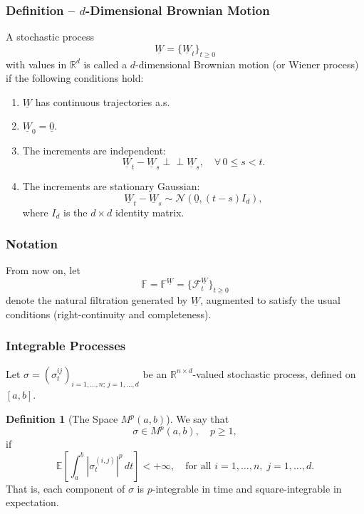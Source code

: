 \documentclass[12pt,a4paper]{article}
\theoremstyle{definition}
\newtheorem{definition}{Definition}[section]
\newcommand{\R}{\mathbb{R}}
\newcommand{\E}{\mathbb{E}}
\begin{document}
\subsubsection{Definition – $d$-Dimensional Brownian Motion}

A stochastic process
\[
\underline{W} = \{\underline{W}_t\}_{t \geq 0}
\]
with values in $\R^d$ is called a $d$-dimensional Brownian motion (or Wiener process) if the following conditions hold:

\begin{enumerate}
\item $\underline{W}$ has continuous trajectories a.s.
\item $\underline{W}_0 = \underline{0}$.
\item The increments are independent:
\[
\underline{W}_t - \underline{W}_s \perp\!\!\!\perp \underline{W}_s, \quad \forall \, 0 \leq s < t.
\]
\item The increments are stationary Gaussian:
\[
\underline{W}_t - \underline{W}_s \sim \mathcal{N}(\underline{0}, (t-s)I_d),
\]
where $I_d$ is the $d \times d$ identity matrix.
\end{enumerate}

\subsubsection{Notation}

From now on, let
\[
\mathbb{F} = \mathbb{F}^{\underline{W}} = \{\mathcal{F}_t^{\underline{W}}\}_{t \geq 0}
\]
denote the natural filtration generated by $\underline{W}$, augmented to satisfy the usual conditions (right-continuity and completeness).

\subsubsection{Integrable Processes}

Let $\sigma = (\sigma_t^{ij})_{i=1,\ldots,n; \, j=1,\ldots,d}$ be an $\R^{n \times d}$-valued stochastic process, defined on $[a,b]$.

\begin{definition}[The Space $M^p(a,b)$]
We say that
\[
\sigma \in M^p(a,b), \quad p \geq 1,
\]
if
\[
\E\left[\int_a^b |\sigma_t^{(i,j)}|^p \, dt\right] < +\infty, \quad \text{for all } i = 1, \ldots, n, \; j = 1, \ldots, d.
\]
That is, each component of $\sigma$ is $p$-integrable in time and square-integrable in expectation.
\end{definition}
\end{document}
